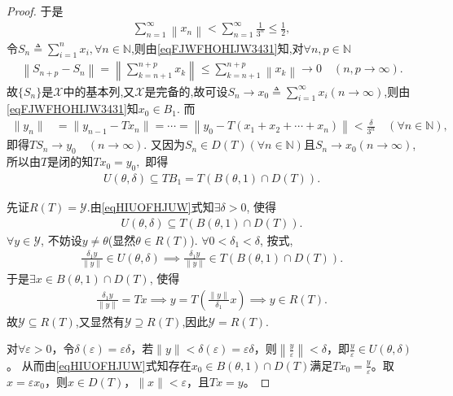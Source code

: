 \documentclass[../../main.tex]{subfiles}%
\begin{document}
\begin{proof}
于是
\begin{align}\label{eqFJWFHOHIJW3431}
\sum_{n=1}^{\infty}{\left\| x_n \right\|}<\sum_{n=1}^{\infty}{\frac{1}{3^n}}\leqslant \frac{1}{2},
\end{align}
令$S_n\triangleq\sum\limits_{i=1}^{n}x_i,\forall n\in\mathbb{N}$,则由\eqref{eqFJWFHOHIJW3431}知,对$\forall n,p\in \mathbb{N}$
\begin{align*}
\left\| S_{n+p}-S_n \right\| =\left\| \sum_{k=n+1}^{n+p}{x_k} \right\| \leqslant \sum_{k=n+1}^{n+p}{\left\| x_k \right\|}\rightarrow 0\quad \left( n,p\rightarrow \infty \right) .
\end{align*}
故$\{S_n\}$是$\mathscr{X}$中的基本列,又$\mathscr{X}$是完备的,故可设$S_n\to x_0\triangleq\sum\limits_{i=1}^{\infty}x_i(n\to\infty)$,则由\eqref{eqFJWFHOHIJW3431}知$x_0\in B_1$.
而
\begin{align*}
\|y_n\|&=\|y_{n-1}-Tx_n\|=\cdots=\left\|y_0-T(x_1+x_2+\cdots+x_n)\right\|<\frac{\delta}{3^n}\quad(\forall n\in\mathbb{N}),
\end{align*}
即得$TS_n\to y_0\quad(n\to\infty).$
又因为$S_n\in D(T)(\forall n\in \mathbb{N})$且$S_n\to x_0(n\to\infty)$, 所以由$T$是闭的知$Tx_0=y_0,$
即得
\begin{align}\label{eqHIUOFHJUW}
U(\theta,\delta)\subseteq TB_1=T(B(\theta,1)\cap D(T)).
\end{align}

先证$R(T)=\mathscr{Y}$.由\eqref{eqHIUOFHJUW}式知$\exists\delta>0$, 使得
\begin{align*}
U(\theta,\delta)\subseteq T(B(\theta,1)\cap D(T)).
\end{align*}
$\forall y\in\mathscr{Y}$, 不妨设$y\neq\theta$(显然$\theta\in R(T)$). $\forall0<\delta_1<\delta$, 按式,
\begin{align*}
\frac{\delta_1 y}{\|y\|}\in U(\theta,\delta)\implies\frac{\delta_1 y}{\|y\|}\in T(B(\theta,1)\cap D(T)).
\end{align*}
于是$\exists x\in B(\theta,1)\cap D(T)$, 使得
\begin{align*}
\frac{\delta_1 y}{\|y\|}=Tx\implies y=T\left(\frac{\|y\|}{\delta_1}x\right)\implies y\in R(T).
\end{align*}
故$\mathscr{Y}\subseteq R(T)$,又显然有$\mathscr{Y}\supseteq R(T)$,因此$\mathscr{Y} = R(T)$.

对$\forall \varepsilon>0$，令$\delta(\varepsilon)=\varepsilon\delta$，若$\|y\|<\delta(\varepsilon)=\varepsilon\delta$，则$\left\|\frac{y}{\varepsilon}\right\|<\delta$，即$\frac{y}{\varepsilon}\in U(\theta,\delta)$。
从而由\eqref{eqHIUOFHJUW}式知存在$x_0\in B(\theta,1)\cap D(T)$满足$Tx_0=\frac{y}{\varepsilon}$。取$x=\varepsilon x_0$，则$x\in D(T)$，$\|x\|<\varepsilon$，且$Tx=y$。
\end{proof}
\end{document}
